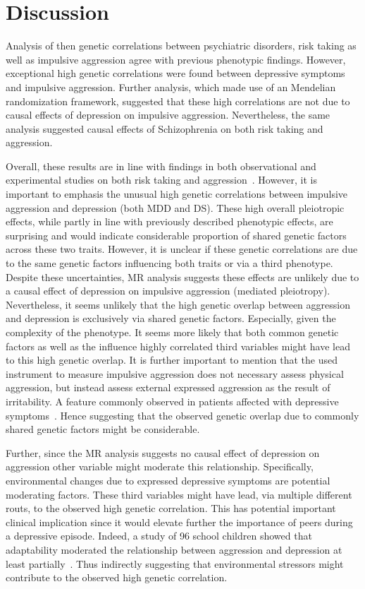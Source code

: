 \section{Discussion}
\label{sec:discussion}

Analysis of then genetic correlations between psychiatric disorders, risk taking as well as impulsive aggression agree with previous phenotypic findings.
However, exceptional high genetic correlations were found between depressive symptoms and impulsive aggression.
Further analysis, which made use of an Mendelian randomization framework, suggested that these high correlations are not due to causal effects of depression on impulsive aggression.
Nevertheless, the same analysis suggested causal effects of Schizophrenia on both risk taking and aggression. 

Overall, these results are in line with findings in both observational and experimental studies on both risk taking and aggression~\cite{Ballester2012,Ouzir2013,Hoptman2015,Sher2005,Roland2002,Taft2009, Dutton2013}.
However, it is important to emphasis the unusual high genetic correlations between impulsive aggression and depression (both MDD and DS).  
These high overall pleiotropic effects, while partly in line with previously described phenotypic effects, are surprising and would indicate considerable proportion of shared genetic factors across these two traits.
However, it is unclear if these genetic correlations are due to the same genetic factors influencing both traits or via a third phenotype.
Despite these uncertainties, MR analysis suggests these effects are unlikely due to a causal effect of depression on impulsive aggression (mediated pleiotropy).
Nevertheless, it seems unlikely that the high genetic overlap between aggression and depression is exclusively via shared genetic factors.
Especially, given the complexity of the phenotype.
It seems more likely that both common genetic factors as well as the influence highly correlated third variables might have lead to this high genetic overlap.
It is further important to mention that the used instrument to measure impulsive aggression does not necessary assess physical aggression, but instead assess external expressed aggression as the result of irritability. 
A feature commonly observed in patients affected with depressive symptoms~\cite{Dutton2013,Clark1994}.
Hence suggesting that the observed genetic overlap due to commonly shared genetic factors might be considerable.

Further, since the MR analysis suggests no causal effect of depression on aggression other variable might moderate this relationship.
Specifically, environmental changes due to expressed depressive symptoms are potential moderating factors.
These third variables might have lead, via multiple different routs, to the observed high genetic correlation.
This has potential important clinical implication since it would elevate further the importance of peers during a depressive episode.
Indeed, a study of 96 school children showed that adaptability moderated the relationship between aggression and depression at least partially~\cite{Lee2015a}.  
Thus indirectly suggesting that environmental stressors might contribute to the observed high genetic correlation. 

